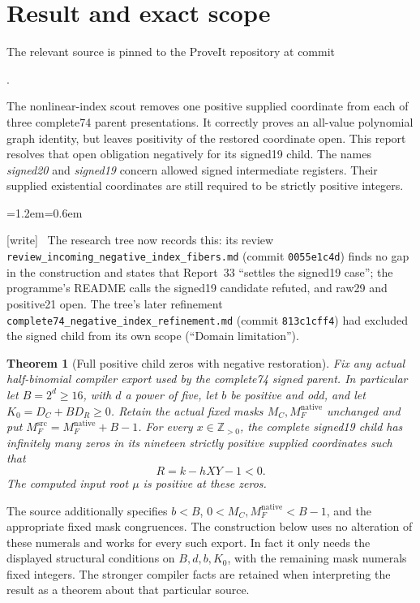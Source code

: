 \documentclass[11pt,letterpaper]{article}
\newtheorem{theorem}{Theorem}[section]
\theoremstyle{definition}\newtheorem{definition}[theorem]{Definition}
\theoremstyle{remark}\newtheorem{remark}[theorem]{Remark}
\newcommand{\pos}{\mathbb Z_{>0}}
\newcommand{\code}[1]{\texttt{\detokenize{#1}}}
\newcommand{\MFnat}{M_{F}^{\mathrm{native}}}
\newcommand{\MFsrc}{M_F^{\mathrm{src}}}
\newcommand{\MC}{M_C}
\newcommand{\wtag}{\textup{[write]}}
\newenvironment{writenote}{\par\smallskip\begin{list}{}{\leftmargin=1.2em\rightmargin=0.6em}\item[]\small\wtag\ }{\end{list}\smallskip}
\newcommand{\rw}[1]{\nolinkurl{#1}}%
\begin{document}
\section{Result and exact scope}
The relevant source is pinned to the ProveIt repository at commit
\begin{center}\small\code{2dde7850ffeb9c923a7bd92e3f2ee2b5af0e36ff}.\end{center}
The nonlinear-index scout removes one positive supplied coordinate from each of three complete74 parent presentations. It correctly proves an all-value polynomial graph identity, but leaves positivity of the restored coordinate open. This report resolves that open obligation negatively for its signed19 child. The names \emph{signed20} and \emph{signed19} concern allowed signed intermediate registers. Their supplied existential coordinates are still required to be strictly positive integers.
\begin{writenote}
The research tree now records this: its review \rw{review_incoming_negative_index_fibers.md} (commit \texttt{0055e1c4d}) finds no gap in the construction and states that Report~33 ``settles the signed19 case''; the programme's README calls the signed19 candidate refuted, and raw29 and positive21 open. The tree's later refinement \rw{complete74_negative_index_refinement.md} (commit \texttt{813c1cff4}) had excluded the signed child from its own scope (``Domain limitation'').
\end{writenote}

\begin{theorem}[Full positive child zeros with negative restoration]\label{fup:ir:thm:main}
Fix any actual half-binomial compiler export used by the complete74 signed parent. In particular let $B=2^d\ge16$, with $d$ a power of five, let $b$ be positive and odd, and let $K_0=D_C+BD_R\ge0$. Retain the actual fixed masks $\MC,\MFnat$ unchanged and put $\MFsrc=\MFnat+B-1$. For every $x\in\pos$, the complete signed19 child has infinitely many zeros in its nineteen strictly positive supplied coordinates such that
\[
 R=k-hXY-1<0.
\]
The computed input root $\mu$ is positive at these zeros.
\end{theorem}
The source additionally specifies $b<B$, $0<\MC,\MFnat<B-1$, and the appropriate fixed mask congruences. The construction below uses no alteration of these numerals and works for every such export. In fact it only needs the displayed structural conditions on $B,d,b,K_0$, with the remaining mask numerals fixed integers. The stronger compiler facts are retained when interpreting the result as a theorem about that particular source.
\end{document}
